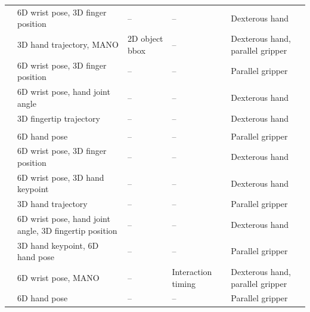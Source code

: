 \documentclass[Afour,sageh,times]{sagej}
\begin{document}
\begin{table}[t]
\begin{tabularx}{\linewidth}{p{3.3cm}p{3.3cm} X X p{3.3cm}}
\cite{cai2025n} & 6D wrist pose, 3D finger position & -- & -- & Dexterous hand \\
\cite{feng2025spatial} & 3D hand trajectory, MANO & 2D object bbox & -- & Dexterous hand, parallel gripper \\
\cite{bi2026h} & 6D wrist pose, 3D finger position & -- & -- & Parallel gripper \\
\cite{zheng2026egoscale} & 6D wrist pose, hand joint angle & -- & -- & Dexterous hand \\
\cite{zhang2026unidex} & 3D fingertip trajectory & -- & -- & Dexterous hand \\
\midrule
\rowcolor{gray!15}
\multicolumn{5}{l}{\textit{Affordance-based co-training}} \\
\cite{kareer2025egomimic} & 6D hand pose & -- & -- & Parallel gripper \\
\cite{qiu2025humanoid} & 6D wrist pose, 3D finger position & -- & -- & Dexterous hand \\
\cite{yuan2025motiontrans} & 6D wrist pose, 3D hand keypoint & -- & -- & Dexterous hand \\
\cite{cheang2025gr} & 3D hand trajectory & -- & -- & Parallel gripper \\
\cite{wen2025gr} & 6D wrist pose, hand joint angle, 3D fingertip position & -- & -- & Dexterous hand \\
\cite{kareer2025emergence} & 3D hand keypoint, 6D hand pose & -- & -- & Parallel gripper \\
\cite{luo2026being} & 6D wrist pose, MANO & -- & Interaction timing & Dexterous hand, parallel gripper \\
\cite{zhu2026emma} & 6D hand pose & -- & -- & Parallel gripper \\
\bottomrule
\end{tabularx}
\end{table}


 
\end{document}
